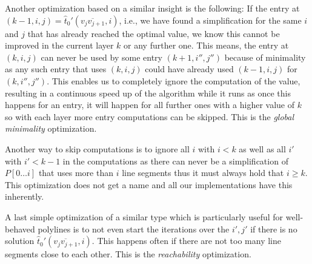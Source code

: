 Another optimization based on a similar insight is the following: If the entry at \((k-1, i, j) = \hat t_0'(\overline{v_{j}v_{j+1}}, i)\), i.e., we have found a simplification for the same \(i\) and \(j\) that has already reached the optimal value, we know this cannot be improved in the current layer \(k\) or any further one. This means, the entry at \((k, i, j)\) can never be used by some entry \((k + 1, i'', j'')\) because of minimality as any such entry that uses \((k, i, j)\) could have already used \((k-1, i, j)\) for \((k, i'', j'')\). This enables us to completely ignore the computation of the value, resulting in a continuous speed up of the algorithm while it runs as once this happens for an entry, it will happen for all further ones with a higher value of \(k\) so with each layer more entry computations can be skipped. This is the \emph{global minimality} optimization.

Another way to skip computations is to ignore all \(i\) with \(i < k\) as well as all \(i'\) with \(i' < k - 1\) in the computations as there can never be a simplification of \(P[0\dots i]\) that uses more than \(i\) line segments thus it must always hold that \(i \geq k\). This optimization does not get a name and all our implementations have this inherently.

A last simple optimization of a similar type which is particularly useful for well-behaved polylines is to not even start the iterations over the \(i', j'\) if there is no solution \(\hat t_0'(\overline{v_{j}v_{j+1}}, i)\). This happens often if there are not too many line segments close to each other. This is the \emph{reachability} optimization. 




